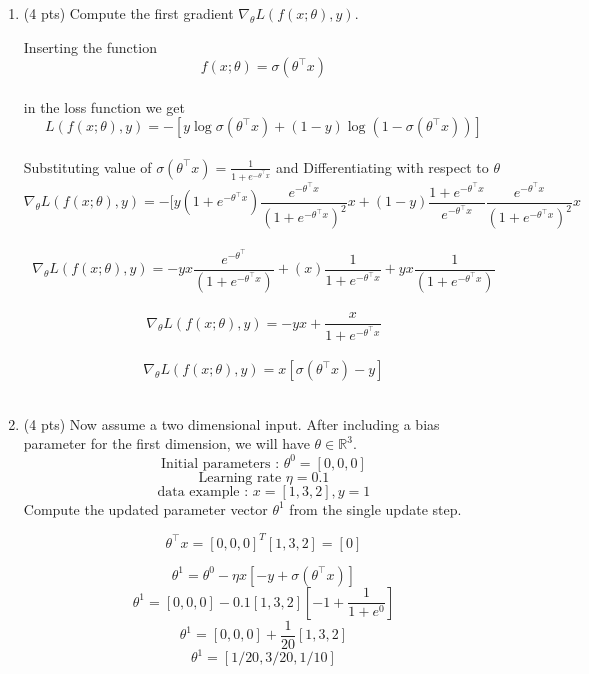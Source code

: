 \documentclass[a4paper]{article}
\theoremstyle{definition}
\newenvironment{soln}{
    \leavevmode\color{blue}\ignorespaces
}{}
\begin{document}
\begin{enumerate}
\begin{enumerate}
	\item (4 pts) Compute the first gradient $\nabla_{\theta} L(f(x;\theta), y)$.
	
	\begin{soln}  Inserting the function $$f(x;\theta) = \sigma(\theta^\top x)$$ \\
 in the loss function we get
 $$L(f(x;\theta), y) = -[y \log \sigma(\theta^\top x)  + (1-y)\log(1-\sigma(\theta^\top x))]$$\\
 Substituting value of $\sigma(\theta^\top x)=\frac{1}{1+e^{-\theta^\top x}}$ and Differentiating with respect to $\theta$\\
 $$\nabla_{\theta} L(f(x;\theta), y)=-[y(1+e^{-\theta^\top x})\frac{e^{-\theta^\top x}}{(1+e^{-\theta^\top x})^2}x+(1-y)\frac{1+e^{-\theta^\top x}}{e^{-\theta^\top x}}\frac{e^{-\theta^\top x}}{(1+e^{-\theta^\top x})^2}x$$\\
 $$\nabla_{\theta} L(f(x;\theta), y)=-yx\frac{e^{-\theta^\top}}{(1+e^{-\theta^\top x})}+(x)\frac{1}{1+e^{-\theta^\top x}}+yx\frac{1}{(1+e^{-\theta^\top x})}$$\\
 $$\nabla_{\theta} L(f(x;\theta), y)=-yx+\frac{x}{1+e^{-\theta^\top x}}$$\\
 $$\nabla_{\theta} L(f(x;\theta), y)=x[\sigma(\theta^\top x)-y]$$\\

 
 \end{soln}
	
	\item (4 pts)
 Now assume a two dimensional input. After including a bias parameter for the first dimension, we will have $\theta\in\mathbb{R}^3$.
$$ \text{Initial parameters : }  \theta^{0}=[0, 0, 0]$$
$$ \text{Learning rate }\eta=0.1$$
$$ \text{data example : } x=[1, 3, 2], y=1$$
Compute the updated parameter vector $\theta^{1}$ from the single update step.
	
	\begin{soln} 
        $$\theta^\top x= [0, 0, 0]^{T} [1, 3, 2] = [0]$$
        
        $$\theta^{1} = \theta^{0} - \eta x[-y+\sigma(\theta^\top x)]$$
       $$ \theta^{1} = [0,0,0] - 0.1 [1,3,2][-1+\frac{1}{1+e^{0}}]$$
        $$\theta^{1} = [0,0,0] +\frac{1}{20} [1,3,2]$$
        $$\theta^{1} = [1/20,3/20,1/10]$$
    \end{soln}
\end{enumerate}
\end{enumerate}
\end{document}
